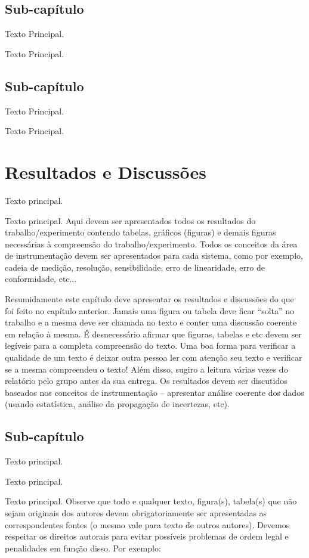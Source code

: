 \documentclass[12pt]{eng04457}
\begin{document}
\subsection{Sub-capítulo}

Texto Principal.

Texto Principal.

\subsection{Sub-capítulo}

Texto Principal.

Texto Principal.

\section{Resultados e Discussões}

Texto principal.

Texto principal. Aqui devem ser apresentados todos os resultados do trabalho/experimento contendo tabelas, gráficos (figuras) e demais figuras necessárias à compreensão do trabalho/experimento. Todos os conceitos da área de instrumentação devem ser apresentados para cada sistema, como por exemplo, cadeia de medição, resolução, sensibilidade, erro de linearidade, erro de conformidade, etc...

Resumidamente este capítulo deve apresentar os resultados e discussões do que foi feito no capítulo anterior. Jamais uma figura ou tabela deve ficar “solta” no trabalho e a mesma deve ser chamada no texto e conter uma discussão coerente em relação à mesma. É desnecessário afirmar que figuras, tabelas e etc devem ser legíveis para a completa compreensão do texto. Uma boa forma para verificar a qualidade de um texto é deixar outra pessoa ler com atenção seu texto e verificar se a mesma compreendeu o texto! Além disso, sugiro a leitura várias vezes do relatório pelo grupo antes da sua entrega. Os resultados devem ser discutidos baseados nos conceitos de instrumentação – apresentar análise coerente dos dados (usando estatística, análise da propagação de incertezas, etc).

\subsection{Sub-capítulo}

Texto principal.

Texto principal.

Texto principal. Observe que todo e qualquer texto, figura(s), tabela(s) que não sejam originais dos autores devem obrigatoriamente ser apresentadas as correspondentes fontes (o mesmo vale para texto de outros autores). Devemos respeitar os direitos autorais para evitar possíveis problemas de ordem legal e penalidades em função disso. Por exemplo:
\end{document}
